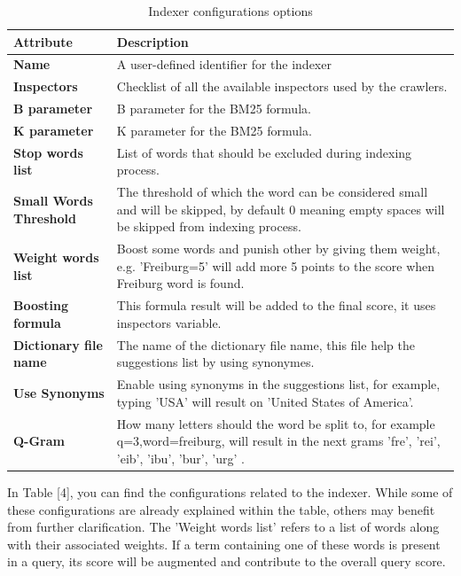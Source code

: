 \begin{table}[ht] 
{\footnotesize
\begin{tabular}{ P{2.5cm} ||P{11.1cm}  }      %
 \hline \hline
\textbf{Attribute} & \textbf{Description}\T\B 
\\ 
\hline
\textbf{Name} & A user-defined identifier for the indexer \T\B 
\\ 
\hline
\textbf{Inspectors} & Checklist of all the available inspectors used by the crawlers. \T\B 
\\ 
\hline
\textbf{B parameter} & B parameter for the BM25 formula. \T\B 
\\ 
\hline
\textbf{K parameter} & K parameter for the BM25 formula. \T\B 
\\ 
\hline
\textbf{Stop words list} & List of words that should be excluded during indexing process. \T\B 
\\ 
\hline
\textbf{Small Words Threshold} & The threshold of which the word can be considered small and will be skipped, by default 0 meaning empty spaces will be skipped from indexing process. \T\B 
\\ 
\hline
\textbf{Weight words list} & Boost some words and punish other by giving them weight, e.g. 'Freiburg=5' will add more 5 points to the score when Freiburg word is found. \T\B 
\\ 
\hline
\textbf{Boosting formula} & This formula result will be added to the final score, it uses inspectors variable. \T\B 
\\ 
\hline
\textbf{Dictionary file name} & The name of the dictionary file name, this file help the suggestions list by using synonymes. \T\B 
\\ 
\hline
\textbf{Use Synonyms} & Enable using synonyms in the suggestions list, for example, typing 'USA' will result on 'United States of America'. \T\B 
\\ 
\hline
\textbf{Q-Gram} & How many letters should the word be split to, for example q=3,word=freiburg, will result in the next grams { 'fre', 'rei', 'eib', 'ibu', 'bur', 'urg' }. \T\B 
\\ 
\hline \hline
    \end{tabular}
}
  \captionsetup{justification=centering,margin=2cm}
  \caption{Indexer configurations options}
  \label{table:indexing-config}
\end{table}

In Table [4], you can find the configurations related to the indexer. While some of these configurations are already explained within the table, others may benefit from further clarification. The 'Weight words list' refers to a list of words along with their associated weights. If a term containing one of these words is present in a query, its score will be augmented and contribute to the overall query score.

